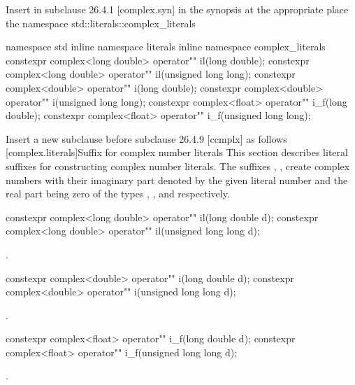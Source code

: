 \documentclass[ebook,11pt,article]{memoir}
\begin{document}
Insert in subclause 26.4.1 [complex.syn] in the synopsis at the appropriate place the namespace std::literals::complex_literals
\begin{codeblock}
namespace std{
inline namespace literals{
inline namespace complex_literals{
constexpr complex<long double> operator"" il(long double);
constexpr complex<long double> operator"" il(unsigned long long);
constexpr complex<double> operator"" i(long double);
constexpr complex<double> operator"" i(unsigned long long);
constexpr complex<float> operator"" i_f(long double);
constexpr complex<float> operator"" i_f(unsigned long long);
}}}
\end{codeblock}

Insert a new subclause before subclause 26.4.9 [ccmplx] as follows
[complex.literals]{Suffix for complex number literals}
\pnum
This section describes literal suffixes for constructing complex number literals. The suffixes , ,  create complex numbers with their imaginary part denoted by the given literal number and the real part being zero of the types , , and  respectively. 

\begin{itemdecl}
constexpr complex<long double> operator"" il(long double d);
constexpr complex<long double> operator"" il(unsigned long long d);
\end{itemdecl}

\begin{itemdescr}
\pnum
\returns
{}.
\end{itemdescr}

\begin{itemdecl}
constexpr complex<double> operator"" i(long double d);
constexpr complex<double> operator"" i(unsigned long long d);
\end{itemdecl}

\begin{itemdescr}
\pnum
\returns
{}.
\end{itemdescr}

\begin{itemdecl}
constexpr complex<float> operator"" i_f(long double d);
constexpr complex<float> operator"" i_f(unsigned long long d);
\end{itemdecl}

\begin{itemdescr}
\pnum
\returns
{}.
\end{itemdescr}
\end{document}
